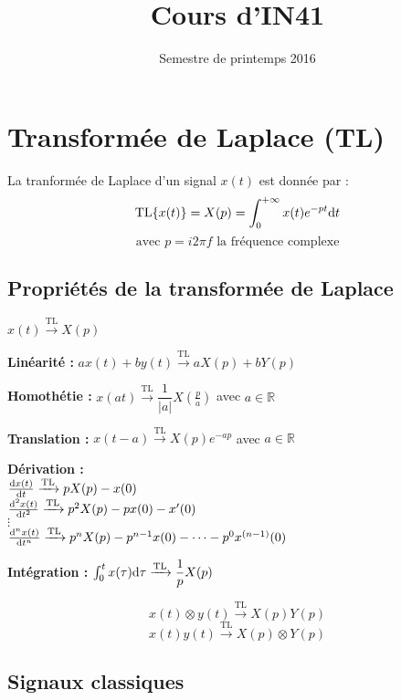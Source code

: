 \documentclass[a4paper,12pt]{article}
\title{Cours d'IN41}{Chapitre 5 -- Systèmes de traitement de signal}
\author{}
\date{Semestre de printemps 2016}
\begin{document}
\maketitlepage

\tableofcontents
\pagebreak

\section{Transformée de Laplace (TL)}

\begin{defi}
    La tranformée de Laplace d'un signal $x(t)$ est donnée par :
    \[ \mathrm{TL} \{ x(t) \} = X(p) = \int_0^{+\infty} x(t) e^{-pt} \mathrm{d}t \]
    \[ \text{avec } p=i2\pi f \text{ la fréquence complexe} \]
\end{defi}

\subsection{Propriétés de la transformée de Laplace}

$x(t) \xrightarrow{\mathrm{TL}} X(p)$

\textbf{Linéarité :} $ax(t) + by(t) \xrightarrow{\mathrm{TL}} aX(p) + bY(p)$

\textbf{Homothétie :} $x(at) \xrightarrow{\mathrm{TL}} \dfrac{1}{|a|} X(\frac{p}{a})$ avec $a \in \mathbb{R}$

\textbf{Translation :} $x(t-a) \xrightarrow{\mathrm{TL}} X(p) e^{-ap}$ avec $a \in \mathbb{R}$

\textbf{Dérivation :} \\
$\frac{\mathrm{d}x(t)}{\mathrm{d}t} \xrightarrow{\mathrm{TL}} pX(p) - x(0)$ \\
$\frac{\mathrm{d}^2 x(t)}{\mathrm{d}t^2} \xrightarrow{\mathrm{TL}} p^2X(p) - px(0) - x'(0)$ \\
$\vdots$ \\
$\frac{\mathrm{d}^n x(t)}{\mathrm{d}t^n} \xrightarrow{\mathrm{TL}} p^nX(p) - p^{n-1}x(0) - \dots - p^0 x^{(n-1)}(0)$

\textbf{Intégration :} $\int_0^t x(\tau) \mathrm{d}\tau \xrightarrow{\mathrm{TL}} \dfrac{1}{p} X(p)$

\begin{defi}
    \[ x(t) \otimes y(t) \xrightarrow{\mathrm{TL}} X(p) Y(p) \]
    \[ x(t) y(t) \xrightarrow{\mathrm{TL}} X(p) \otimes Y(p) \]
\end{defi}

\subsection{Signaux classiques}
\end{document}
